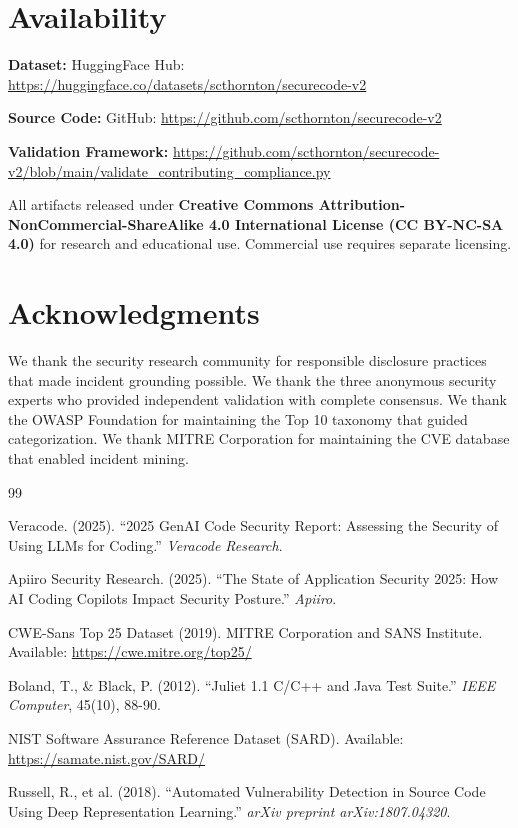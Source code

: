 \documentclass[11pt,letterpaper]{article}
\begin{document}
\section*{Availability}

{\raggedright
\textbf{Dataset:} HuggingFace Hub: \url{https://huggingface.co/datasets/scthornton/securecode-v2}

\textbf{Source Code:} GitHub: \url{https://github.com/scthornton/securecode-v2}

\textbf{Validation Framework:} \url{https://github.com/scthornton/securecode-v2/blob/main/validate_contributing_compliance.py}

All artifacts released under \textbf{Creative Commons Attribution-NonCommercial-ShareAlike 4.0 International License (CC BY-NC-SA 4.0)} for research and educational use. Commercial use requires separate licensing.
\par}

\section*{Acknowledgments}

We thank the security research community for responsible disclosure practices that made incident grounding possible. We thank the three anonymous security experts who provided independent validation with complete consensus. We thank the OWASP Foundation for maintaining the Top 10 taxonomy that guided categorization. We thank MITRE Corporation for maintaining the CVE database that enabled incident mining.


\begin{thebibliography}{99}

Veracode. (2025). ``2025 GenAI Code Security Report: Assessing the Security of Using LLMs for Coding.'' \textit{Veracode Research}.

Apiiro Security Research. (2025). ``The State of Application Security 2025: How AI Coding Copilots Impact Security Posture.'' \textit{Apiiro}.

CWE-Sans Top 25 Dataset (2019). MITRE Corporation and SANS Institute. Available: \url{https://cwe.mitre.org/top25/}

Boland, T., \& Black, P. (2012). ``Juliet 1.1 C/C++ and Java Test Suite.'' \textit{IEEE Computer}, 45(10), 88-90.

NIST Software Assurance Reference Dataset (SARD). Available: \url{https://samate.nist.gov/SARD/}

Russell, R., et al. (2018). ``Automated Vulnerability Detection in Source Code Using Deep Representation Learning.'' \textit{arXiv preprint arXiv:1807.04320}.

\end{thebibliography}
\end{document}
